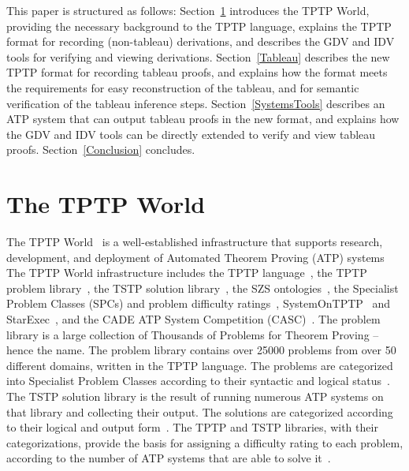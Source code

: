 \documentclass[runningheads]{llncs}
\begin{document}
This paper is structured as follows:
Section~\ref{TPTP} introduces the TPTP World, providing the necessary background to the TPTP
language, explains the TPTP format for recording (non-tableau) derivations, and describes the
GDV and IDV tools for verifying and viewing derivations.
Section~\ref{Tableau} describes the new TPTP format for recording tableau proofs, and explains how
the format meets the requirements for easy reconstruction of the tableau, and for semantic 
verification of the tableau inference steps.
Section~\ref{SystemsTools} describes an ATP system that can output tableau proofs in the new
format, and explains how the GDV and IDV tools can be directly extended to verify and view
tableau proofs.
Section~\ref{Conclusion} concludes.

\section{The TPTP World}
\label{TPTP}

The TPTP World~\cite{Sut24} is a well-established infrastructure that supports research, 
development, and deployment of Automated Theorem Proving (ATP) systems %
The TPTP World infrastructure includes
the TPTP language~\cite{SS+06},
the TPTP problem library~\cite{Sut09},
the TSTP solution library~\cite{Sut10},
the SZS ontologies~\cite{Sut08-KEAPPA},
the Specialist Problem Classes (SPCs) and problem difficulty ratings~\cite{SS01},
SystemOnTPTP~\cite{Sut00-CADE-17} and StarExec~\cite{SST14},
and the CADE ATP System Competition (CASC)~\cite{Sut16}.
The problem library is a large collection of Thousands of Problems for Theorem Proving -- hence 
the name. 
The problem library contains over 25000 problems from over 50 different domains, written in the 
TPTP language.
The problems are categorized into Specialist Problem Classes according to their syntactic and
logical status~\cite{Sut08-KEAPPA}.
The TSTP solution library is the result of running numerous ATP systems on that library and 
collecting their output. 
The solutions are categorized according to their logical and output form~\cite{Sut08-KEAPPA}.
The TPTP and TSTP libraries, with their categorizations, provide the basis for assigning a difficulty 
rating to each problem, according to the number of ATP systems that are able to solve 
it~\cite{SS01}.
\end{document}
